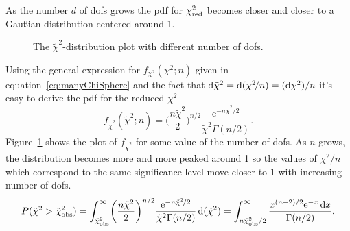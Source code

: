 \documentclass[
	10pt,
	draft
]{scrreprt}
\newcommand{\eu}{\ensuremath{\mathrm{e}}}
\begin{document}
As the number $d$ of \acp{dof} grows the \ac{pdf} for $\chi^2_\textup{red}$ becomes closer and closer to a Gau\ss{}ian distribution centered around \num{1}.
\begin{figure}
	\centering
{}
	\caption{The $\tilde\chi^2$-distribution plot with different number of \acp{dof}.}
	\label{fig:RedChiSquareDistro}
\end{figure}
Using the general expression for $f_{\chi^2}(\chi^2;n)$ given in equation~\eqref{eq:manyChiSphere} and the fact that $\mathop{}\!\mathrm{d}\tilde\chi^2=\mathop{}\!\mathrm{d}(\chi^2\!/n) = (\mathop{}\!\mathrm{d}\chi^2)/n$ it's easy to derive the \ac{pdf} for the reduced $\chi^2$
\begin{equation}
f_{\tilde\chi^2}(\tilde\chi^2;n) = \biggl(\frac{n\tilde\chi^2}{2}\biggr)^{n/2} \frac{\eu^{-n\tilde\chi^2\!/2}}{\tilde\chi^2\Gamma(n/2)}.
\end{equation}
Figure~\ref{fig:RedChiSquareDistro} shows the plot of $f_{\tilde\chi^2}$ for some value of the number of \acp{dof}.
As $n$ grows, the distribution becomes more and more peaked around \num{1} so the values of $\chi^2\!/n$ which correspond to the same significance level move closer to \num{1} with increasing number of \acp{dof}.
\begin{equation}\label{eq:ProbChiSquareGeneral}
P(\tilde\chi^2>\tilde\chi^2_\textup{obs}) 
=\int_{\tilde\chi^2_\textup{obs}}^\infty \biggl(\frac{n\tilde\chi^2}{2}\biggr)^{n/2} \frac{\eu^{-n\tilde\chi^2\!/2}}{\tilde\chi^2\Gamma(n/2)}\ud(\tilde\chi^2)%
= \int_{n\tilde\chi^2_\textup{obs}/2}^\infty \frac{x^{(n-2)/2}\eu^{-x}\ud x}{\Gamma(n/2)}.
\end{equation}
\end{document}
